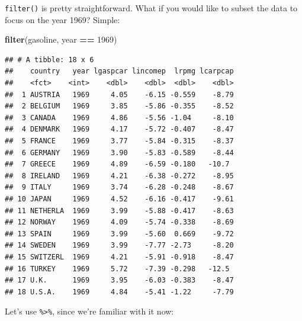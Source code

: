 \documentclass[]{gitbook}
\newenvironment{Shaded}{\begin{snugshade}}{\end{snugshade}}
\newcommand{\DecValTok}[1]{\textcolor[rgb]{0.00,0.00,0.81}{#1}}
\newcommand{\KeywordTok}[1]{\textcolor[rgb]{0.13,0.29,0.53}{\textbf{#1}}}
\newcommand{\NormalTok}[1]{#1}
\newcommand{\OperatorTok}[1]{\textcolor[rgb]{0.81,0.36,0.00}{\textbf{#1}}}
\newcommand{\StringTok}[1]{\textcolor[rgb]{0.31,0.60,0.02}{#1}}
\begin{document}
\texttt{filter()} is pretty straightforward. What if you would like to subset the data to focus on the
year 1969? Simple:

\begin{Shaded}
\begin{Highlighting}[]
\KeywordTok{filter}\NormalTok{(gasoline, year }\OperatorTok{==}\StringTok{ }\DecValTok{1969}\NormalTok{)}
\end{Highlighting}
\end{Shaded}

\begin{verbatim}
## # A tibble: 18 x 6
##    country   year lgaspcar lincomep  lrpmg lcarpcap
##    <fct>    <int>    <dbl>    <dbl>  <dbl>    <dbl>
##  1 AUSTRIA   1969     4.05    -6.15 -0.559    -8.79
##  2 BELGIUM   1969     3.85    -5.86 -0.355    -8.52
##  3 CANADA    1969     4.86    -5.56 -1.04     -8.10
##  4 DENMARK   1969     4.17    -5.72 -0.407    -8.47
##  5 FRANCE    1969     3.77    -5.84 -0.315    -8.37
##  6 GERMANY   1969     3.90    -5.83 -0.589    -8.44
##  7 GREECE    1969     4.89    -6.59 -0.180   -10.7 
##  8 IRELAND   1969     4.21    -6.38 -0.272    -8.95
##  9 ITALY     1969     3.74    -6.28 -0.248    -8.67
## 10 JAPAN     1969     4.52    -6.16 -0.417    -9.61
## 11 NETHERLA  1969     3.99    -5.88 -0.417    -8.63
## 12 NORWAY    1969     4.09    -5.74 -0.338    -8.69
## 13 SPAIN     1969     3.99    -5.60  0.669    -9.72
## 14 SWEDEN    1969     3.99    -7.77 -2.73     -8.20
## 15 SWITZERL  1969     4.21    -5.91 -0.918    -8.47
## 16 TURKEY    1969     5.72    -7.39 -0.298   -12.5 
## 17 U.K.      1969     3.95    -6.03 -0.383    -8.47
## 18 U.S.A.    1969     4.84    -5.41 -1.22     -7.79
\end{verbatim}

Let's use \texttt{\%\textgreater{}\%}, since we're familiar with it now:

\begin{Shaded}
\end{Shaded}
\end{document}
